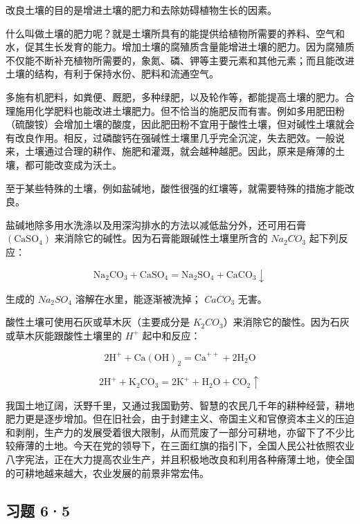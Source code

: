 改良土壤的目的是增进土壤的肥力和去除妨碍植物生长的因素。

什么叫做土壤的肥力呢？就是土壤所具有的能提供给植物所需要的养料、空气和水，促其生长发育的能力。增加土壤的腐殖质含量能增进土壤的肥力。因为腐殖质不仅能不断补充植物所需要的，象氮、磷、钾等主要元素和其他元素；而且能改进土壤的结构，有利于保持水份、肥料和流通空气。

多施有机肥料，如粪便、厩肥，多种绿肥，以及轮作等，都能提高土壤的肥力。合理施用化学肥料也能改进土壤肥力。但不恰当的施肥反而有害。例如多用肥田粉（硫酸铵）会增加土壤的酸度，因此肥田粉不宜用于酸性土壤，但对碱性土壤就会有改良作用。相反，过磷酸钙在强碱性土壤里几乎完全沉淀，失去肥效。一般说来，土壤通过合理的耕作、施肥和灌溉，就会越种越肥。因此，原来是瘠薄的土壤，都可能改变成为沃土。

至于某些特殊的土壤，例如盐碱地，酸性很强的红壤等，就需要特殊的措施才能改良。

盐碱地除多用水洗涤以及用深沟排水的方法以减低盐分外，还可用石膏
\(\left(\mathrm{CaSO}_{4}\right)\)
来消除它的碱性。因为石膏能跟碱性土壤里所含的 \(Na_{2}CO_{3}\)
起下列反应：

\[
\mathrm{Na} _ {2} \mathrm{CO} _ {3} + \mathrm{CaSO} _ {4} = \mathrm{Na} _ {2} \mathrm{SO} _ {4} + \mathrm{CaCO} _ {3} \downarrow
\]

生成的 \(Na_{2}SO_{4}\) 溶解在水里，能逐渐被洗掉； \(CaCO_{3}\) 无害。

酸性土壤可使用石灰或草木灰（主要成分是
\(K_{2}CO_{3}\)）来消除它的酸性。因为石灰或草木灰能跟酸性土壤里的
\(H^{+}\) 起中和反应：

\[
2 \mathrm{H} ^ {+} + \mathrm{Ca(OH)} _ {2} = \mathrm{Ca} ^ {+ +} + 2 \mathrm{H} _ {2} \mathrm{O}
\]

\[
2 \mathrm{H} ^ {+} + \mathrm{K} _ {2} \mathrm{CO} _ {3} = 2 \mathrm{K} ^ {+} + \mathrm{H} _ {2} \mathrm{O} + \mathrm{CO} _ {2} \uparrow
\]

我国土地辽阔，沃野千里，又通过我国勤劳、智慧的农民几千年的耕种经营，耕地肥力更是逐步增加。但在旧社会，由于封建主义、帝国主义和官僚资本主义的压迫和剥削，生产力的发展受着很大限制，从而荒废了一部分可耕地，亦留下了不少比较瘠薄的土地。今天在党的领导下，在三面红旗的指引下，全国人民公社依照农业八字宪法，正在大力提高农业生产，并且积极地改良和利用各种瘠薄土地，使全国的可耕地越来越大，农业发展的前景非常宏伟。

\subsection{习题 6·5}


